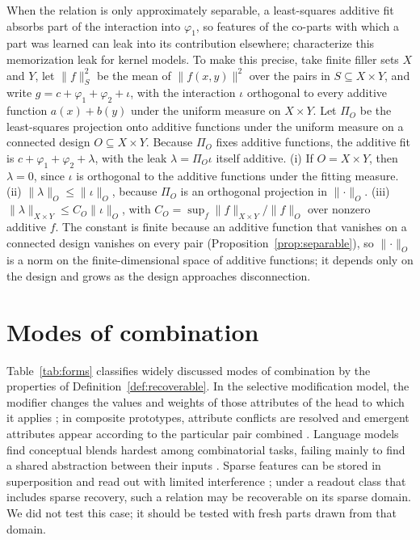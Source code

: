 \documentclass[10pt]{article}
\theoremstyle{plain}
\theoremstyle{remark}
\begin{document}
\noindent
When the relation is only approximately separable, a least-squares additive fit absorbs part of the interaction into $\varphi_1$, so features of the co-parts with which a part was learned can leak into its contribution elsewhere; \citet{lippl2025} characterize this memorization leak for kernel models. To make this precise, take finite filler sets $X$ and $Y$, let $\lVert f \rVert_S^2$ be the mean of $\lVert f(x, y) \rVert^2$ over the pairs in $S \subseteq X \times Y$, and write $g = c + \varphi_1 + \varphi_2 + \iota$, with the interaction $\iota$ orthogonal to every additive function $a(x) + b(y)$ under the uniform measure on $X \times Y$. Let $\Pi_O$ be the least-squares projection onto additive functions under the uniform measure on a connected design $O \subseteq X \times Y$. Because $\Pi_O$ fixes additive functions, the additive fit is $c + \varphi_1 + \varphi_2 + \lambda$, with the leak $\lambda = \Pi_O \iota$ itself additive. (i) If $O = X \times Y$, then $\lambda = 0$, since $\iota$ is orthogonal to the additive functions under the fitting measure. (ii) $\lVert \lambda \rVert_O \le \lVert \iota \rVert_O$, because $\Pi_O$ is an orthogonal projection in $\lVert \cdot \rVert_O$. (iii) $\lVert \lambda \rVert_{X \times Y} \le C_O \lVert \iota \rVert_O$, with $C_O = \sup_f \lVert f \rVert_{X \times Y} / \lVert f \rVert_O$ over nonzero additive $f$. The constant is finite because an additive function that vanishes on a connected design vanishes on every pair (Proposition~\ref{prop:separable}), so $\lVert \cdot \rVert_O$ is a norm on the finite-dimensional space of additive functions; it depends only on the design and grows as the design approaches disconnection.

\section{Modes of combination}
\label{app:forms}

Table~\ref{tab:forms} classifies widely discussed modes of combination by the properties of Definition~\ref{def:recoverable}. In the selective modification model, the modifier changes the values and weights of those attributes of the head to which it applies \citep{smith1988}; in composite prototypes, attribute conflicts are resolved and emergent attributes appear according to the particular pair combined \citep{hampton1987}. Language models find conceptual blends hardest among combinatorial tasks, failing mainly to find a shared abstraction between their inputs \citep{schapiro2025}. Sparse features can be stored in superposition and read out with limited interference \citep{elhage2022}; under a readout class that includes sparse recovery, such a relation may be recoverable on its sparse domain. We did not test this case; it should be tested with fresh parts drawn from that domain.
\end{document}
